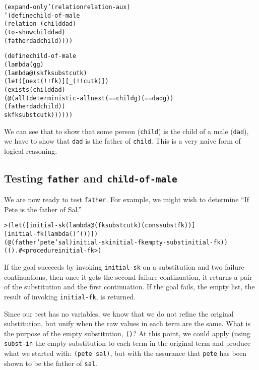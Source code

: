 \begin{alltt}
(expand-only '(relation relation-aux)
  '(define child-of-male
     (relation _ (child dad)
       (to-show child dad)
       (father dad child))))

(define child-of-male
  (lambda (g g)
    (lambda@ (sk fk subst cutk)
      (let ([next (!! fk)] [_ (!! cutk)])
        (exists (child dad)
          (@ (all (deterministic-all next (== child g) (== dad g))
               (father dad child))
             sk fk subst cutk))))))
\end{alltt}

We can see that to show that some person (\texttt{child}) is the child
of a male (\texttt{dad}), we have to show that \texttt{dad} is the
father of \texttt{child}.  This is a very naive form of logical reasoning.

\subsection{Testing \texttt{father} and \texttt{child-of-male}}

We are now ready to test \texttt{father}.  For example, we might wish
to determine ``If Pete is the father of Sal.''

\begin{alltt}
> (let ([initial-sk (lambda@ (fk subst cutk) (cons subst fk))]
        [initial-fk (lambda () '())])
    (@ (father 'pete 'sal) initial-sk initial-fk empty-subst initial-fk))
(() . #<procedure initial-fk>)
\end{alltt}

If the goal succeeds by invoking \texttt{initial-sk} on a substitution
and two failure continuations, then once it gets the second failure
continuation, it returns a pair of the substitution and the
first continuation. If the goal fails, the empty list, the result of
invoking \texttt{initial-fk}, is returned.

Since our test has no variables, we know that we do not refine the
original substitution, but unify when the raw values in each term are
the same.  What is the purpose of the empty substitution, \texttt{()}?
At this point, we could apply (using \texttt{subst-in} the empty
substitution to each term in the original term and produce what we
started with: \texttt{(pete sal)}, but with the assurance that
\texttt{pete} has been shown to be the father of \texttt{sal}.

